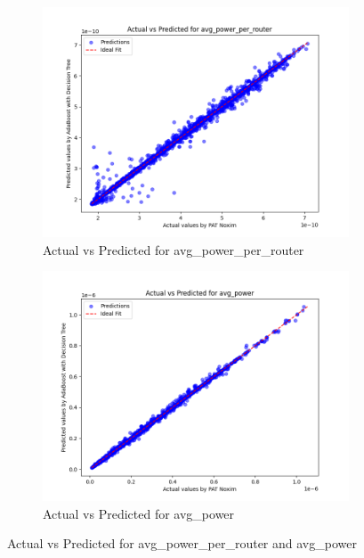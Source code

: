 \documentclass[conference]{IEEEtran}
\begin{document}
\begin{figure}[htbp]
    \begin{subfigure}{0.24\textwidth}
        \centering
        \includegraphics[width=\linewidth]{actual_vs_predicted_avg_power_per_router.png}
        \caption{Actual vs Predicted for avg\_power\_per\_router}
        \label{fig:actual_vs_predicted_avg_power_per_router}
    \end{subfigure}
    \hfill
    \begin{subfigure}{0.24\textwidth}
        \centering
        \includegraphics[width=\linewidth]{actual_vs_predicted_avg_power.png}
        \caption{Actual vs Predicted for avg\_power}
        \label{fig:actual_vs_predicted_avg_power}
    \end{subfigure}

    \caption{Actual vs Predicted for avg\_power\_per\_router and avg\_power}
    \label{fig:side_by_side_graphs_avg_power_per_router_avg_power}
\end{figure}
\end{document}
